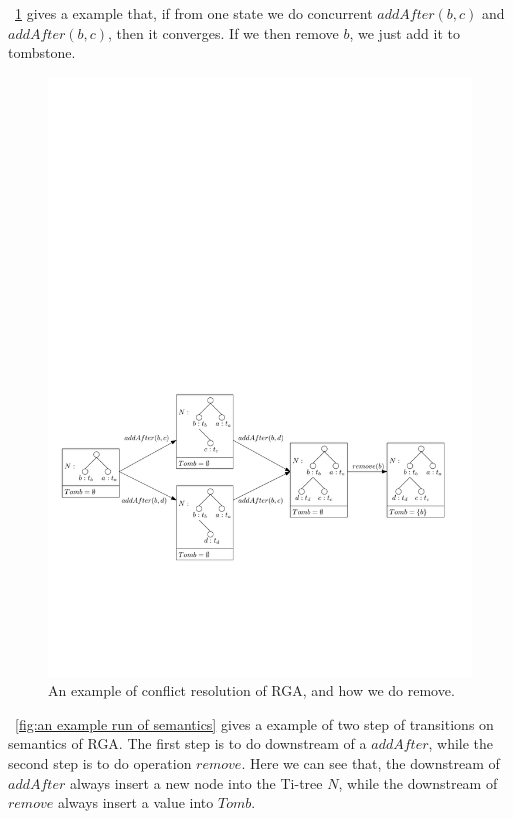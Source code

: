 \figurename~\ref{fig:how RGA works} gives a example that, if from one state we do concurrent $addAfter(b,c)$ and $addAfter(b,c)$, then it converges. If we then remove $b$, we just add it to tombstone.

\begin{figure}[t]
  \centering
  \includegraphics[width=0.85 \textwidth]{figures/HowRGAWork.pdf}
\vspace{-10pt}
  \caption{An example of conflict resolution of RGA, and how we do remove.}
  \label{fig:how RGA works}
\end{figure}


\figurename~\ref{fig:an example run of semantics} gives a example of two step of transitions on semantics of RGA. The first step is to do downstream of a $addAfter$, while the second step is to do operation $remove$. Here we can see that, the downstream of $addAfter$ always insert a new node into the Ti-tree $N$, while the downstream of $remove$ always insert a value into $Tomb$.


